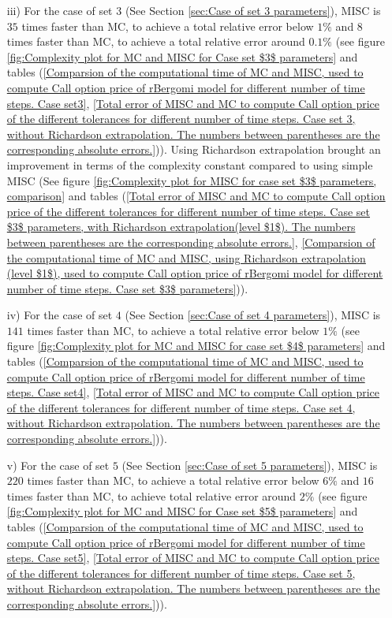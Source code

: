 \begin{enumerate}
		
		
		
			\item [iii)]  For the case of set $3$ (See Section \ref{sec:Case of set 3 parameters}), MISC is  $35$ times faster than MC, to achieve  a total relative error below $1\%$ and $8$ times faster than MC, to achieve a total relative error around $0.1\%$ (see figure \ref{fig:Complexity plot for MC and MISC for Case set $3$ parameters} and tables (\ref{Comparsion of the computational time of  MC and MISC, used to compute Call option price of rBergomi model for different number of time steps. Case set3}, \ref{Total error of MISC and MC to compute Call option price of the different tolerances for different number of time steps. Case set 3, without Richardson extrapolation. The numbers between parentheses are the corresponding absolute errors.})). Using Richardson extrapolation brought an improvement in terms of the  complexity constant compared to using simple MISC (See figure \ref{fig:Complexity plot for  MISC for case set $3$ parameters, comparison} and tables (\ref{Total  error of MISC and MC to compute Call option price of the different tolerances for different number of time steps. Case set $3$ parameters, with Richardson extrapolation(level $1$). The numbers between parentheses are the corresponding absolute errors.}, \ref{Comparsion of the computational time of  MC and MISC, using Richardson extrapolation (level $1$), used to compute Call option price of rBergomi model for different number of time steps. Case set $3$ parameters})).
				
	 	\item [iv)] For the case of set $4$ (See Section \ref{sec:Case of set 4 parameters}), MISC is  $141$ times faster than MC, to achieve a total relative error below $1\%$ (see figure \ref{fig:Complexity plot for MC and MISC for case set $4$ parameters} and tables (\ref{Comparsion of the computational time of  MC and MISC, used to compute Call option price of rBergomi model for different number of time steps. Case set4}, \ref{Total error of MISC and MC to compute Call option price of the different tolerances for different number of time steps. Case set 4, without Richardson extrapolation. The numbers between parentheses are the corresponding absolute errors.})).
		
	\item [v)] For the case of set $5$ (See Section \ref{sec:Case of set 5 parameters}), MISC is  $220$ times faster than MC, to achieve a total relative error below $6\%$ and $16$ times faster than MC, to achieve total relative error around $2\%$  (see figure \ref{fig:Complexity plot for MC and MISC for Case set $5$ parameters} and tables (\ref{Comparsion of the computational time of  MC and MISC, used to compute Call option price of rBergomi model for different number of time steps. Case set5}, \ref{Total error of MISC and MC to compute Call option price of the different tolerances for different number of time steps. Case set 5, without Richardson extrapolation. The numbers between parentheses are the corresponding absolute errors.})).
		
	\end{enumerate}

